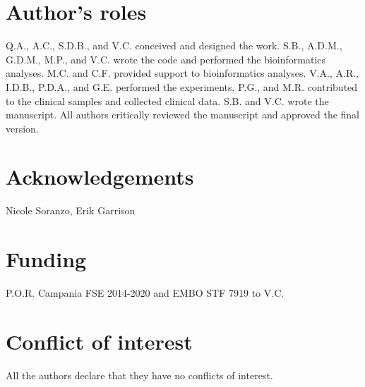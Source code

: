 \section*{Author’s roles}
Q.A., A.C., S.D.B., and V.C. conceived and designed the work. 
S.B., A.D.M., G.D.M., M.P., and V.C. wrote the code and performed the bioinformatics analyses.
M.C. and C.F. provided support to bioinformatics analyses. 
V.A., A.R., I.D.B., P.D.A., and G.E. performed the experiments.  
P.G., and M.R. contributed to the clinical samples and collected clinical data. 
S.B. and V.C. wrote the manuscript. 
All authors critically reviewed the manuscript and approved the final version.



\section*{Acknowledgements}
Nicole Soranzo, Erik Garrison 


\section*{Funding}
P.O.R. Campania FSE 2014-2020 and EMBO STF 7919 to V.C. 

\section*{Conflict of interest}
All the authors declare that they have no conflicts of interest.